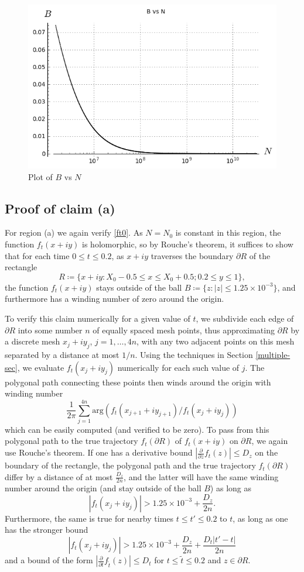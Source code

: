 \begin{figure}[h!]
  \includegraphics[width=0.7\linewidth]{B_vs_N.png}
  \caption{Plot of $B$ vs $N$}\label{bnp}
\end{figure}


\subsection{Proof of claim (a)}\label{barrier-sec}

For region (a) we again verify \eqref{ft0}.
As $N = N_0$ is constant in this region, the function $f_t(x+iy)$ is holomorphic, so by Rouche's theorem, it suffices to show that for each time $0 \leq t \leq 0.2$, as $x+iy$ traverses the boundary $\partial R$ of the rectangle 
$$ R \coloneqq \{ x+iy: X_0 - 0.5 \leq x \leq X_0 + 0.5; 0.2 \leq y \leq 1 \},$$
the function $f_t(x+iy)$ stays outside of the ball $B \coloneqq \{ z: |z| \leq 1.25 \times 10^{-3} \}$, and furthermore has a winding number of zero around the origin.

To verify this claim numerically for a given value of $t$, we subdivide each edge of $\partial R$ into some number $n$ of equally spaced mesh points, thus approximating $\partial R$ by a discrete mesh $x_j+iy_j$, $j=1,\dots,4n$, with any two adjacent points on this mesh separated by a distance at most $1/n$.  Using the techniques in Section \ref{multiple-sec}, we evaluate $f_t(x_j+iy_j)$ numerically for each such value of $j$.  The polygonal path connecting these points then winds around the origin with winding number
$$ \frac{1}{2\pi} \sum_{j=1}^{4n} \mathrm{arg}( f_t(x_{j+1}+iy_{j+1}) / f_t(x_j + i y_j) )$$
which can be easily computed (and verified to be zero).  To pass from this polygonal path to the true trajectory $f_t(\partial R)$ of $f_t(x+iy)$ on $\partial R$, we again use Rouche's theorem.  If one has a derivative bound $|\frac{\partial}{\partial z} f_t(z)| \leq D_z$ on the boundary of the rectangle, the polygonal path and the true trajectory $f_t(\partial R)$ differ by a distance of at most $\frac{D_z}{2n}$, and the latter will have the same winding number around the origin (and stay outside of the ball $B$) as long as
$$ |f_t(x_j + iy_j)| > 1.25 \times 10^{-3} + \frac{D_z}{2n}.$$
Furthermore, the same is true for nearby times $t \leq t' \leq 0.2$ to $t$, as long as one has the stronger bound
\begin{equation}\label{cond}
 |f_t(x_j + iy_j)| > 1.25 \times 10^{-3} + \frac{D_z}{2n} + \frac{D_t |t'-t|}{2n}
\end{equation}
and a bound of the form $|\frac{\partial}{\partial t} f_{\tilde t}(z)| \leq D_t$
for $t \leq \tilde t \leq 0.2$ and $z \in \partial R$.

